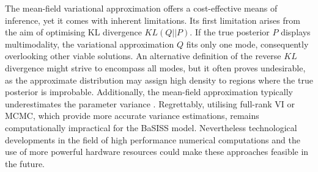 The mean-field variational approximation offers a cost-effective means of inference, yet it comes with inherent limitations. Its first limitation arises from the aim of optimising KL divergence $KL(Q||P)$. If the true posterior $P$ displays multimodality, the variational approximation $Q$ fits only one mode, consequently overlooking other viable solutions. An alternative definition of the reverse $KL$ divergence might strive to encompass all modes, but it often proves undesirable, as the approximate distribution may assign high density to regions where the true posterior is improbable. Additionally, the mean-field approximation typically underestimates the parameter variance \parencite{Kucukelbir2016-gn}. Regrettably, utilising full-rank \ac{VI} or \ac{MCMC}, which provide more accurate variance estimations, remains computationally impractical for the \ac{BaSISS} model. Nevertheless technological developments in the field of high performance numerical computations and the use of more powerful hardware resources could make these approaches feasible in the future. 